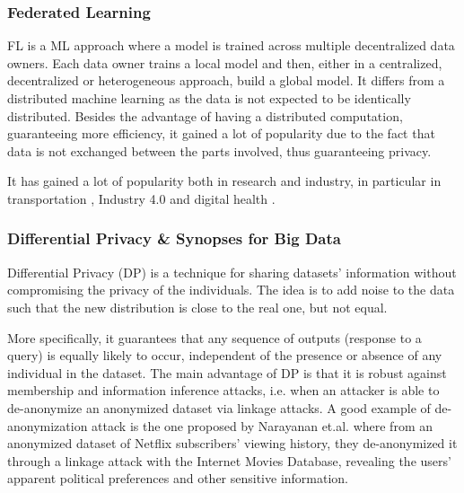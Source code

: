 \documentclass[12pt]{article}
\begin{document}
\subsubsection{Federated Learning}
FL is a ML approach where a model is trained across multiple decentralized data owners. Each data owner trains a local model and then, 
either in a centralized, decentralized or heterogeneous approach, build a global model. It differs from a distributed machine learning 
as the data is not expected to be identically distributed. Besides the advantage of having a distributed computation, 
guaranteeing more efficiency, it gained a lot of popularity due to the fact that data is not exchanged between the parts involved, thus guaranteeing privacy.

It has gained a lot of popularity both in research and industry, in particular in transportation \cite*{Elbir2020}, Industry 4.0 \cite*{Shubyn2022} and digital health \cite*{Prayitno2021}.
\subsubsection{Differential Privacy \& Synopses for Big Data}
Differential Privacy (DP) is a technique for sharing datasets' information without compromising the privacy of the individuals. 
The idea is to add noise to the data such that the new distribution is close to the real one, but not equal. 

More specifically, it guarantees that any sequence of outputs (response to a query) is equally likely 
to occur, independent of the presence or absence of any individual in the dataset. The main advantage of DP is that it is robust 
against membership and information inference attacks, i.e. when an attacker is able to de-anonymize an anonymized dataset via 
linkage attacks. A good example of de-anonymization attack is the one proposed by Narayanan et.al. \cite*{Nara2008} where from an 
anonymized dataset of Netflix subscribers' viewing history, they de-anonymized it through a linkage attack with the Internet Movies Database, 
revealing the users' apparent political preferences and other sensitive information.
\end{document}

